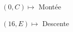 \documentclass[preview]{standalone}
\begin{document}
\begin{center}
$(0,C) \mapsto$ Montée

$(16,E) \mapsto$ Descente
\end{center}
\end{document}
